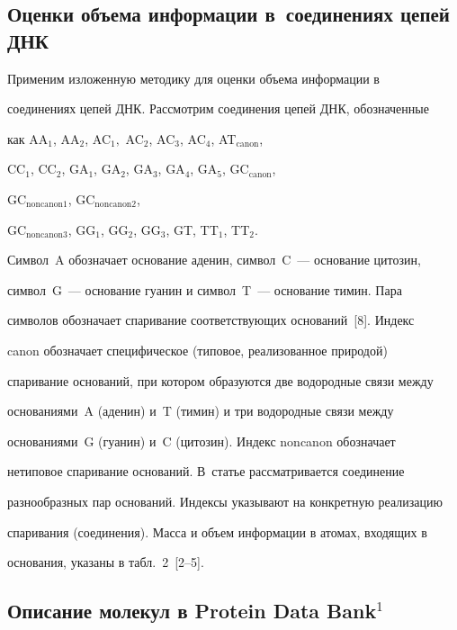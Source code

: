   


\subsection{Оценки объема информации в~соединениях цепей ДНК}





   Применим изложенную методику для оценки объема информации в 


соединениях цепей ДНК. Рассмотрим соединения цепей ДНК, обозначенные 


как AA$_1$, AA$_2$, AC$_1,$ AC$_2$, AC$_3$, AC$_4$, AT$_{\mathrm{canon}}$, 


CC$_1$, CC$_2$, GA$_1$, GA$_2$, GA$_3$, GA$_4$, GA$_5$, GC$_{\mathrm{canon}}$, 


GC$_{\mathrm{noncanon1}}$, GC$_{\mathrm{noncanon2}}$, 


GC$_{\mathrm{noncanon3}}$, GG$_1$, GG$_2$, GG$_3$, GT, TT$_1$, TT$_2$. 


Символ~A обозначает основание аденин, символ~C~--- основание цитозин, 


символ~G~--- основание гуанин и символ~T~--- основание тимин. Пара 


символов обозначает спаривание соответствующих оснований~[8]. Индекс 


canon обозначает специфическое (типовое, реализованное природой) 


спаривание оснований, при котором образуются две водородные связи между 


основаниями~A (аденин) и~T (тимин) и три водородные связи между 


основаниями~G (гуанин) и~C (цитозин). Индекс noncanon обозначает 


нетиповое спаривание оснований. В~статье рассматривается соединение 


разнообразных пар оснований. Индексы указывают на конкретную реализацию 


спаривания (соединения). Масса и объем информации в атомах, входящих в 


основания, указаны в табл.~2~[2--5].


      





     


\subsection{Описание молекул в Protein Data Bank$^1$}





